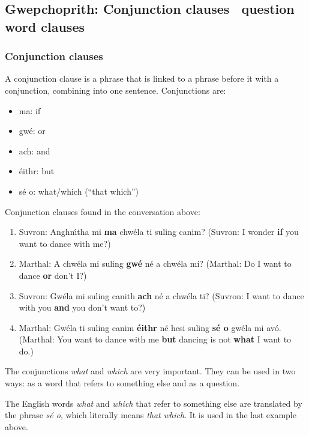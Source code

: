 \subsection{Gwepchoprith: Conjunction clauses \textendash\ question word clauses}

\subsubsection{Conjunction clauses}

A conjunction clause is a phrase that is linked to a phrase before it with a conjunction, combining into one sentence. Conjunctions are:

\begin{itemize}
  \item ma: if
  \item gw\'{e}: or
  \item ach: and
  \item \'{e}ithr: but
  \item s\'{e} o: what/which (``that which'')
\end{itemize}

Conjunction clauses found in the conversation above:
\begin{enumerate}
  \item Suvron: Anghn\'{\i}tha mi \textbf{ma} chw\'{e}la ti suling canim?
(Suvron: I wonder \textbf{if} you want to dance with me?)
  \item Marthal: A chw\'{e}la mi suling \textbf{gw\'{e}} n\'{e} a chw\'{e}la mi?
(Marthal: Do I want to dance \textbf{or} don't I?)
  \item Suvron: Gw\'{e}la mi suling canith \textbf{ach} n\'{e} a chw\'{e}la ti?
(Suvron: I want to dance with you \textbf{and} you don't want to?)
\item Marthal: Gw\'{e}la ti suling canim \textbf{\'{e}ithr} n\'{e} hesi suling \textbf{s\'{e} o} gw\'{e}la mi av\'{o}.
(Marthal: You want to dance with me \textbf{but} dancing is not \textbf{what} I want to do.)
\end{enumerate}

The conjunctions \textit{what} and \textit{which} are very important. They can be used in two ways: as a word that refers to something else and as a question.

The English words \textit{what} and \textit{which} that refer to something else are translated by the phrase \textit{s\'{e} o}, which literally means \textit{that which}. It is used in the last example above.

